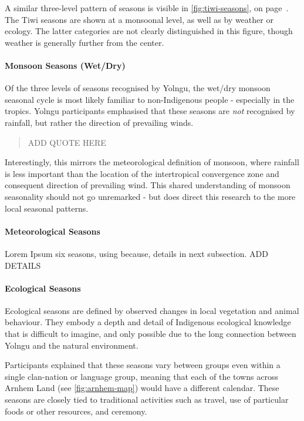 A similar three-level pattern of seasons is visible in \autoref{fig:tiwi-seasons},
on page~\pageref{fig:tiwi-seasons}.  The Tiwi seasons are shown at a monsoonal level,
as well as by weather or ecology.  The latter categories are not clearly distinguished
in this figure, though weather is generally further from the center.


\paragraph{Monsoon Seasons (Wet/Dry)}

Of the three levels of seasons recognised by Yolngu,
the wet/dry monsoon seasonal cycle is most likely familiar to non-Indigenous people -
especially in the tropics.  Yolngu participants emphasised that these seasons
are \emph{not} recognised by rainfall, but rather the direction of prevailing winds.

\blockquote{
    ADD QUOTE HERE
}

Interestingly, this mirrors the meteorological definition of monsoon,
where rainfall is less important than the location of the intertropical
convergence zone and consequent direction of prevailing wind.
This shared understanding of monsoon seasonality should not go unremarked -
but does direct this research to the more local seasonal patterns.


\paragraph{Meteorological Seasons}

Lorem Ipsum six seasons, using because, details in next subsection.  ADD DETAILS





\paragraph{Ecological Seasons}
Ecological seasons are defined by observed changes in local vegetation
and animal behaviour.  They embody a depth and detail of Indigenous
ecological knowledge that is difficult to imagine, and only possible
due to the long connection between Yolngu and the natural environment.

Participants explained that these seasons vary between groups even within
a single clan-nation or language group, meaning that each of the towns
across Arnhem Land (see \autoref{fig:arnhem-map}) would have a different
calendar.  
%
These seasons are closely tied to traditional activities such as travel,
use of particular foods or other resources, and ceremony.

